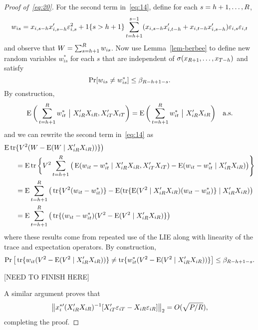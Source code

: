 \documentclass[12pt]{article}
\begin{document}
\begin{proof}[Proof of~\eqref{eq:20}]
For the second term in~\eqref{eq:14}, define for each $s=h+1,\dots,R$,
\begin{equation*}
  w_{is} = x_{i,s-h} x_{i,s-h}' \varepsilon_{i,s}^2 + \operatorname{1}\{s > h+1\}
  \sum_{t=h+1}^{s-1} (x_{i,s-h} x_{i,t-h}' + x_{i,t-h} x_{i,s-h}')
  \varepsilon_{i,s} \varepsilon_{i,t}
\end{equation*}
and observe that $W = \sum_{s=h+1}^{R} w_{is}$. Now use
Lemma~\ref{lem-berbee} to define new random variables $w_{is}^*$ for
each $s$ that are independent of $\sigma(x_{R+1},\dots,x_{T-h})$ and
satisfy
\begin{equation*}
  \Pr[w_{is} \neq w_{is}^*] \leq \beta_{R -h + 1- s}.
\end{equation*}
By construction,
\begin{equation*}
  \E\bigg(\sum_{t=\h+1}^R w_{it}^*\ \big|\ X_{iR}'X_{iR}, X_{iT}'X_{iT}\bigg)
  =  \E\bigg(\sum_{t=\h+1}^R w_{it}^*\ \big|\ X_{iR}'X_{iR}\bigg) \quad\text{a.s.}
\end{equation*}
and we can rewrite the second term in~\eqref{eq:14} as
\begin{align*}
  \operatorname{E} \operatorname{tr}&\{ V^2 (W - \operatorname{E}(W \mid X_{iR}'X_{iR}))\}\big) \\
  &= \operatorname{E} \operatorname{tr}\bigg\{V^2 \sum_{t=h+1}^R \big(\operatorname{E}(w_{it} - w_{it}^* \mid
  X_{iR}'X_{iR}, X_{iT}'X_{iT}) - \operatorname{E}(w_{it} - w_{it}^* \mid
  X_{iR}'X_{iR})\big) \Bigg\} \\
  &= \operatorname{E} \sum_{t=h+1}^R \big(\operatorname{tr}\{V^2 (w_{it} - w_{it}^*)\}
  - \operatorname{E}(\operatorname{tr}\{\operatorname{E}(V^2 \mid X_{iR}'X_{iR}) (w_{it} - w_{it}^*)\} \mid
  X_{iR}'X_{iR}) \big) \\
  &= \operatorname{E} \sum_{t=h+1}^R \big(\operatorname{tr}\{(w_{it} - w_{it}^*)
  (V^2 - \operatorname{E}(V^2 \mid X_{iR}'X_{iR})\} \big)
\end{align*}
where these results come from repeated use of the LIE along with
linearity of the trace and expectation operators. By construction,
\begin{equation*}
  \Pr\big[\operatorname{tr}\{w_{it} (V^2 - \operatorname{E}(V^2 \mid X_{iR}'X_{iR}))\}
  \neq \operatorname{tr}\{w_{it}^* (V^2 - \operatorname{E}(V^2 \mid X_{iR}'X_{iR}))\}\big]
  \leq  \beta_{R -h + 1- s}.
\end{equation*}

[NEED TO FINISH HERE]

A similar argument proves that
\begin{equation*}
  \big\| x_i^{*\prime} (X_{iR}'X_{iR})^{-1}
  [X_{iT}'\mathbf{\varepsilon}_{iT} - X_{iR} \mathbf{\varepsilon}_{iR} ] \big\|_2 =  O(\sqrt{P/R}),
\end{equation*}
completing the proof.
\end{proof}
\end{document}
